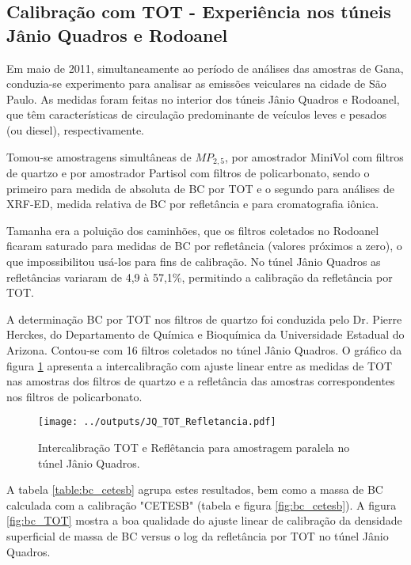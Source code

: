 \newpage
\subsection{Calibração com TOT - Experiência nos túneis Jânio Quadros e Rodoanel}

Em maio de 2011, simultaneamente ao período de análises das amostras de Gana, 
conduzia-se experimento para analisar as emissões veiculares na cidade de São 
Paulo. As medidas foram feitas no interior dos túneis Jânio Quadros e Rodoanel,
que têm características de circulação predominante de veículos leves e pesados 
(ou diesel), respectivamente. 

Tomou-se amostragens simultâneas de $MP_{2,5}$, por amostrador MiniVol com 
filtros de quartzo e por amostrador Partisol com filtros de policarbonato, 
sendo o primeiro para medida de absoluta de BC por TOT e o segundo para análises
de XRF-ED, medida relativa de BC por refletância e para cromatografia iônica.

Tamanha era a poluição dos caminhões, que os filtros coletados no Rodoanel 
ficaram saturado para medidas de BC por refletância (valores próximos a zero), 
o que impossibilitou usá-los para fins de calibração. No túnel Jânio Quadros as 
refletâncias variaram de 4,9 à 57,1\%, permitindo a calibração da refletância 
por TOT.

A determinação BC por TOT nos filtros de quartzo foi conduzida pelo Dr. Pierre 
Herckes, do Departamento de Química e Bioquímica da Universidade Estadual do 
Arizona. Contou-se com 16 filtros coletados no túnel Jânio Quadros. 
O gráfico da figura \ref{table:interJQ} apresenta a intercalibração com ajuste 
linear entre as medidas de TOT nas amostras dos filtros de quartzo e a 
refletância das amostras correspondentes nos filtros de policarbonato.

\begin{figure}[H]
  \centering
  \texttt{[image: ../outputs/JQ\_TOT\_Refletancia.pdf]}
  \caption{Intercalibração TOT e Reflêtancia para amostragem paralela no 
           túnel Jânio Quadros. \label{table:interJQ}}
\end{figure}

A tabela \ref{table:bc_cetesb} agrupa estes resultados, bem como a massa de BC 
calculada com a calibração "CETESB" (tabela  e figura \ref{fig:bc_cetesb}). 
A figura \ref{fig:bc_TOT} mostra a boa qualidade do ajuste linear de calibração 
da densidade superficial de massa de BC versus o log da refletância 
por TOT no túnel Jânio Quadros.    


